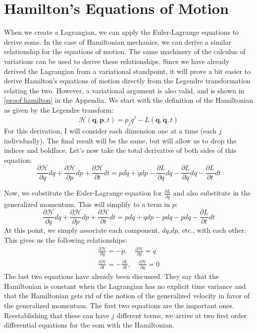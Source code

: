 \section{Hamilton's Equations of Motion}
When we create a \gls{Lagrangian}, we can apply the Euler-Lagrange equations to derive \glspl{eom}. In the case of \gls{Hamiltonian} mechanics, we can derive a similar relationship for the equations of motion. The same machinery of the calculus of variations can be used to derive these relationships. Since we have already derived the \gls{Lagrangian} from a variational standpoint, it will prove a bit easier to derive Hamilton's equations of motion directly from the Legendre transformation relating the two. However, a variational argument is also valid, and is shown in \autoref{proof:hamilton} in the Appendix. We start with the definition of the \gls{Hamiltonian} as given by the Legendre transform:
$$\mathcal{H}(\bm{q},\bm{p},t)=p_j\dot{q}^j-L(\bm{q},\bm{\dot{q}},t)$$
For this derivation, I will consider each dimension one at a time (each $j$ individually). The final result will be the same, but will allow us to drop the indices and boldface. Let's now take the total derivative of both sides of this equation:
$$\frac{\partial\mathcal{H}}{\partial q}dq+\frac{\partial\mathcal{H}}{\partial p}dp+\frac{\partial\mathcal{H}}{\partial t}dt=p d\dot{q}+\dot{q}dp-\frac{\partial L}{\partial q}dq-\frac{\partial L}{\partial \dot{q}}d\dot{q}-\frac{\partial L}{\partial t}dt$$

Now, we substitute the Euler-Lagrange equation for $\frac{\partial L}{\partial q}$ and also substitute in the generalized momentum. This will simplify to a term in $\dot{p}$:
$$\frac{\partial\mathcal{H}}{\partial q}dq+\frac{\partial\mathcal{H}}{\partial p}dp+\frac{\partial\mathcal{H}}{\partial t}dt=p d\dot{q}+\dot{q}dp-\dot{p}dq-pd\dot{q}-\frac{\partial L}{\partial t}dt$$
At this point, we simply associate each component, $dq$,$dp$, etc., with each other. This gives us the following relationships:
\begin{gather}
\frac{\partial\mathcal{H}}{\partial q}=-\dot{p},\quad \frac{\partial\mathcal{H}}{\partial p}=\dot{q}\\
\frac{\partial\mathcal{H}}{\partial t}=-\frac{\partial L}{\partial t},\quad\frac{\partial\mathcal{H}}{\partial \dot{q}}=0
\end{gather}
The last two equations have already been discussed. They say that the \gls{Hamiltonian} is constant when the \gls{Lagrangian} has no explicit time variance and that the \gls{Hamiltonian} gets rid of the notion of the generalized velocity in favor of the generalized momentum. The first two equations are the important ones. Reestablishing that these can have $j$ different terms, we arrive at two first order differential equations for the \gls{eom} with the \gls{Hamiltonian}.


